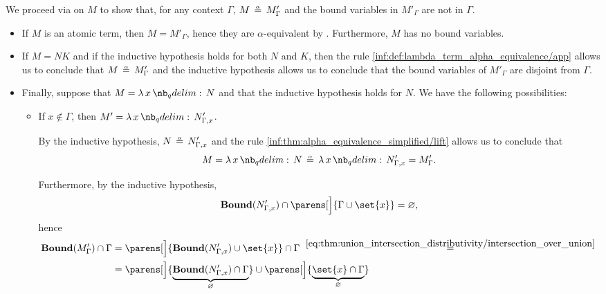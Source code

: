 \begin{defproof}
  We proceed via  on \( M \) to show that, for any context \( \Gamma \), \( M \aequiv M'_\Gamma \) and the bound variables in \( M'_\Gamma \) are not in \( \Gamma \).

  \begin{itemize}
    \item If \( M \) is an atomic term, then \( M = M'_\Gamma \), hence they are \( \alpha \)-equivalent by . Furthermore, \( M \) has no bound variables.

    \item If \( M = NK \) and if the inductive hypothesis holds for both \( N \) and \( K \), then the rule \ref{inf:def:lambda_term_alpha_equivalence/app} allows us to conclude that \( M \aequiv M'_\Gamma \) and the inductive hypothesis allows us to conclude that the bound variables of \( M'_\Gamma \) are disjoint from \( \Gamma \).

    \item Finally, suppose that \( M = \qabs x N \) and that the inductive hypothesis holds for \( N \). We have the following possibilities:
    \begin{itemize}
      \item If \( x \not\in \Gamma \), then \( M' = \qabs x N'_{\Gamma,x} \).

      By the inductive hypothesis, \( N \aequiv N'_{\Gamma,x} \) and the rule \ref{inf:thm:alpha_equivalence_simplified/lift} allows us to conclude that
      \begin{equation*}
        M = \qabs x N \aequiv \qabs x N'_{\Gamma,x} = M'_\Gamma.
      \end{equation*}

      Furthermore, by the inductive hypothesis,
      \begin{equation*}
        \op*{Bound}(N'_{\Gamma,x}) \cap \parens[\Big]{ \Gamma \cup \set{ x } } = \varnothing,
      \end{equation*}
      hence
      \begin{align*}
        \op*{Bound}(M'_\Gamma) \cap \Gamma
        &=
        \parens[\Big]{ \op*{Bound}(N'_{\Gamma,x}) \cup \set{ x } } \cap \Gamma
        \reloset {\eqref{eq:thm:union_intersection_distributivity/intersection_over_union}} = \\ &=
        \parens[\Big]{ \underbrace{\op*{Bound}(N'_{\Gamma,x}) \cap \Gamma }_\varnothing } \cup \parens[\Big]{ \underbrace{\set{ x } \cap \Gamma}_\varnothing }
      \end{align*}


\end{itemize}
\end{itemize}
\end{defproof}
